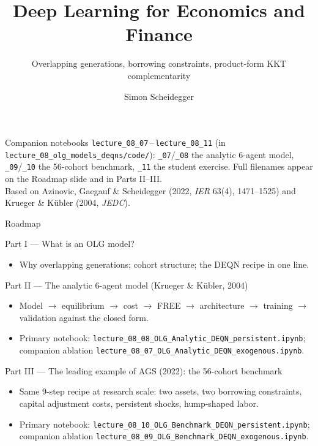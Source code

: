 \documentclass[aspectratio=169,11pt]{beamer}
\title[Deep Learning for Dynamic Economic Models]
{Deep Learning for Economics and Finance}
\subtitle{Overlapping generations, borrowing constraints, product-form KKT complementarity}
\author{Simon Scheidegger}
\institute[HEC Lausanne]{HEC, University of Lausanne}
\date{}
\begin{document}
{
\begin{frame}
\titlepage
\vspace{-0.4cm}
\begin{center}
{\footnotesize Companion notebooks \texttt{lecture\_08\_07}\,--\,\texttt{lecture\_08\_11} (in \texttt{lecture\_08\_olg\_models\_deqns/code/}): \texttt{\_07}/\texttt{\_08} the analytic 6-agent model, \texttt{\_09}/\texttt{\_10} the 56-cohort benchmark, \texttt{\_11} the student exercise.  Full filenames appear on the Roadmap slide and in Parts II--III.}\\[3pt]
{\footnotesize Based on Azinovic, Gaegauf \& Scheidegger (2022, \emph{IER} 63(4), 1471--1525) and Krueger \& K\"ubler (2004, \emph{JEDC}).}
\end{center}
\end{frame}
}

\begin{frame}{Roadmap}
\footnotesize
\begin{block}{Part I --- What is an OLG model?}
\vspace{-3pt}\begin{itemize}\itemsep0pt
    \item Why overlapping generations; cohort structure; the DEQN recipe in one line.
\end{itemize}
\end{block}
\vspace{-2pt}
\begin{block}{Part II --- The analytic 6-agent model (Krueger \& K\"ubler, 2004)}
\vspace{-3pt}\begin{itemize}\itemsep0pt
    \item Model $\to$ equilibrium $\to$ cost $\to$ FREE $\to$ architecture $\to$ training $\to$ validation against the closed form.
    \item Primary notebook: \texttt{lecture\_08\_08\_OLG\_Analytic\_DEQN\_persistent.ipynb}; companion ablation \texttt{lecture\_08\_07\_OLG\_Analytic\_DEQN\_exogenous.ipynb}.
\end{itemize}
\end{block}
\vspace{-2pt}
\begin{block}{Part III --- The leading example of AGS (2022): the 56-cohort benchmark}
\vspace{-3pt}\begin{itemize}\itemsep0pt
    \item Same 9-step recipe at research scale: two assets, two borrowing constraints, capital adjustment costs, persistent shocks, hump-shaped labor.
    \item Primary notebook: \texttt{lecture\_08\_10\_OLG\_Benchmark\_DEQN\_persistent.ipynb}; companion ablation \texttt{lecture\_08\_09\_OLG\_Benchmark\_DEQN\_exogenous.ipynb}.
\end{itemize}
\end{block}
\end{frame}
\end{document}
